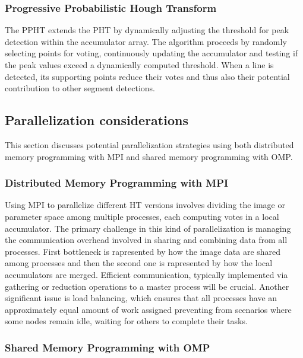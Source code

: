 \documentclass[conference]{IEEEtran}
\begin{document}
    \subsubsection{Progressive Probabilistic Hough Transform}
    \label{sec:ppht}
        The PPHT extends the PHT by dynamically adjusting the threshold for peak detection within the accumulator array. The algorithm proceeds by randomly selecting points for voting, continuously updating the accumulator and testing if the peak values exceed a dynamically computed threshold. When a line is detected, its supporting points reduce their votes and thus also their potential contribution to other segment detections.
                
    \subsection{Parallelization considerations}
    \label{sec:parallel_ht}
        
        This section discusses potential parallelization strategies using both distributed memory programming with MPI and shared memory programming with OMP.
        
        \subsubsection{Distributed Memory Programming with MPI}
    
            Using MPI to parallelize different HT versions involves dividing the image or parameter space among multiple processes, each computing votes in a local accumulator. The primary challenge in this kind of parallelization is managing the communication overhead involved in sharing and combining data from all processes. First bottleneck is rapresented by how the image data are shared among processes and then the second one is rapresented by how the local accumulators are merged. Efficient communication, typically implemented via gathering or reduction operations to a master process will be crucial. Another significant issue is load balancing, which ensures that all processes have an approximately equal amount of work assigned preventing from scenarios where some nodes remain idle, waiting for others to complete their tasks.
    
        \subsubsection{Shared Memory Programming with OMP}
        \label{sec:OMP}
        
\end{document}
